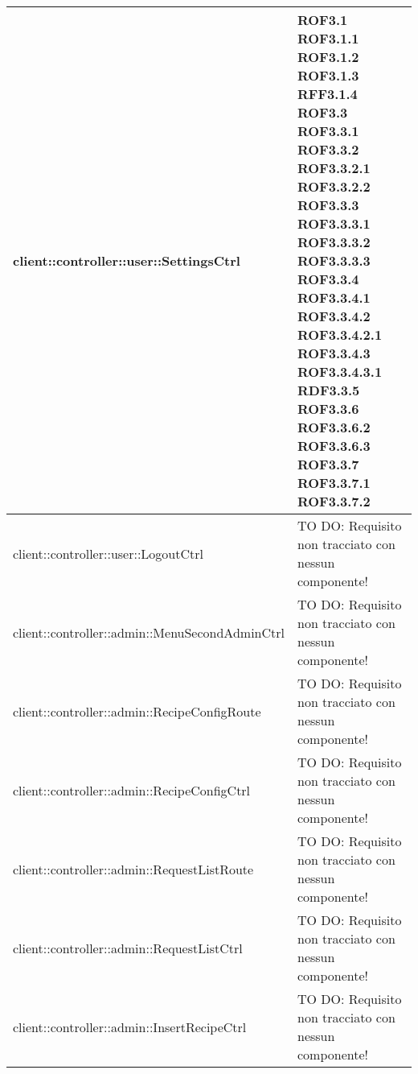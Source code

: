 \begin{center}
\begin{longtable}{| p{11cm} | p{2.5cm} |}
client::controller::user::SettingsCtrl & ROF3.1 \newline ROF3.1.1 \newline ROF3.1.2 \newline ROF3.1.3 \newline RFF3.1.4 \newline ROF3.3 \newline ROF3.3.1 \newline ROF3.3.2 \newline ROF3.3.2.1 \newline ROF3.3.2.2 \newline ROF3.3.3 \newline ROF3.3.3.1 \newline ROF3.3.3.2 \newline ROF3.3.3.3 \newline ROF3.3.4 \newline ROF3.3.4.1 \newline ROF3.3.4.2 \newline ROF3.3.4.2.1 \newline ROF3.3.4.3 \newline ROF3.3.4.3.1 \newline RDF3.3.5 \newline ROF3.3.6 \newline ROF3.3.6.2 \newline ROF3.3.6.3 \newline ROF3.3.7 \newline ROF3.3.7.1 \newline ROF3.3.7.2 \\
\hline
client::controller::user::LogoutCtrl & TO DO: Requisito non tracciato con nessun componente! \\
\hline
client::controller::admin::MenuSecondAdminCtrl & TO DO: Requisito non tracciato con nessun componente! \\
\hline
client::controller::admin::RecipeConfigRoute & TO DO: Requisito non tracciato con nessun componente! \\
\hline
client::controller::admin::RecipeConfigCtrl & TO DO: Requisito non tracciato con nessun componente! \\
\hline
client::controller::admin::RequestListRoute & TO DO: Requisito non tracciato con nessun componente! \\
\hline
client::controller::admin::RequestListCtrl & TO DO: Requisito non tracciato con nessun componente! \\
\hline
client::controller::admin::InsertRecipeCtrl & TO DO: Requisito non tracciato con nessun componente! \\

\end{longtable}
\end{center}
